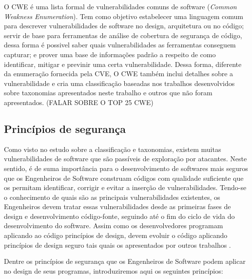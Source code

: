 %
O CWE é uma lista formal de vulnerabilidades comuns de software (\emph{Common Weakness Enumeration}). Tem como objetivo estabelecer uma linguagem comum para descrever vulnerabilidades de software no design, arquitetura ou no código; servir de base para ferramentas de análise de cobertura de segurança de código, dessa forma é possivel saber quais vulnerabilidades as ferramentas conseguem capturar; e prover uma base de informações padrão a respeito de como identificar, mitigar e previnir uma certa vulnerabilidade. Dessa forma, diferente da enumeração fornecida pela CVE, O CWE também inclui detalhes sobre a vulnerabilidade e cria uma classificação baseadas nos trabalhos desenvolvidos sobre taxonomias apresentados neste trabalho e outros que não foram apresentados.
(FALAR SOBRE O TOP 25 CWE)
%

\subsection{Princípios de segurança}
\label{sec-security-principles}

Como visto no estudo sobre a classificação e taxonomias, existem muitas vulnerabilidades de software que são passíveis de exploração por atacantes. Neste sentido, é de suma importância para o desenvolvimento de softwares mais seguros que os Engenheiros de Software construam códigos com qualidade suficiente que os permitam identificar, corrigir e evitar a inserção de vulnerabilidades. Tendo-se o conhecimento de quais são as principais vulnerabilidades existentes, os Engenheiros devem tratar essas vulnerabilidades desde as primeiras fases de design e desenvolvimento código-fonte, seguindo até o fim do ciclo de vida do desenvolvimento do software. Assim como os desenvolvedores programam aplicando ao código princípios de design, devem evoluir o código aplicando princípios de design seguro tais quais os apresentados por outros trabalhos \cite{saltzer1975} \cite{bishop2003} \cite{mcgraw2002} \cite{a1lshammari2009}.

%

Dentre os princípios de segurança que os Engenheiros de Software podem aplicar no design de seus programas, introduziremos aqui os seguintes princípios:

